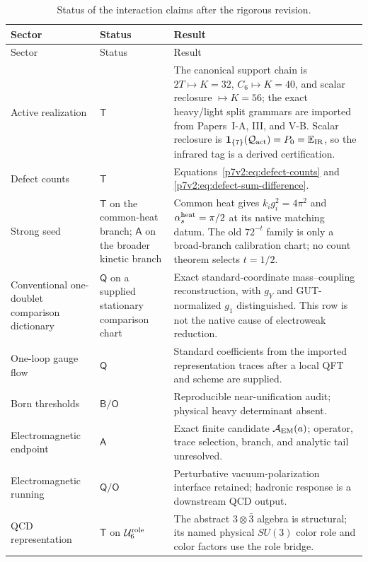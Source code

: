\documentclass[12pt,a4paper]{article}
\newcommand{\Aem}{\mathcal A_{\rm EM}}
\newcommand{\Urole}{\mathcal U_6^{\rm role}}
\begin{document}
\begin{longtable}{@{}L{0.22\textwidth}L{0.17\textwidth}L{0.53\textwidth}@{}}
\caption[Complete Paper--V-C result ledger]{Status of the interaction claims
after the rigorous revision.}\label{p7v2:tab:result-ledger}\\
\toprule
Sector & Status & Result\\
\midrule
\endfirsthead
\toprule
Sector & Status & Result\\
\midrule
\endhead
Active realization
& \(\mathsf T\)
& The canonical support chain is
\(2T\mapsto K=32\), \(C_6\mapsto K=40\), and scalar reclosure
\(\mapsto K=56\); the exact heavy/light split grammars are imported from
Papers~I-A, III, and V-B.  Scalar reclosure is
\(\mathbf1_{\{7\}}(\mathcal Q_{\rm act})=P_0=\mathbb E_{\rm IR}\), so the
infrared tag is a derived certification.\\
Defect counts
& \(\mathsf T\)
& Equations~\eqref{p7v2:eq:defect-counts} and
\eqref{p7v2:eq:defect-sum-difference}.\\
Strong seed
& \(\mathsf T\) on the common-heat branch; \(\mathsf A\) on the broader kinetic branch
& Common heat gives \(k_i g_i^2=4\pi^2\) and
\(\alpha_s^{\rm heat}=\pi/2\) at its native matching datum.  The old
\(72^{-t}\) family is only a broad-branch calibration chart; no count theorem
selects \(t=1/2\).\\
Conventional one-doublet comparison dictionary
& \(\mathsf Q\) on a supplied stationary comparison chart
& Exact standard-coordinate mass--coupling reconstruction, with \(g_Y\) and
GUT-normalized \(g_1\) distinguished.  This row is not the native cause of
electroweak reduction.\\
One-loop gauge flow
& \(\mathsf Q\)
& Standard coefficients from the imported representation traces after a local
QFT and scheme are supplied.\\
Born thresholds
& \(\mathsf B/\mathsf O\)
& Reproducible near-unification audit; physical heavy determinant absent.\\
Electromagnetic endpoint
& \(\mathsf A\)
& Exact finite candidate \(\Aem(a)\); operator, trace selection, branch, and
analytic tail unresolved.\\
Electromagnetic running
& \(\mathsf Q/\mathsf O\)
& Perturbative vacuum-polarization interface retained; hadronic response is a
downstream QCD output.\\
QCD representation
& \(\mathsf T\) on \(\Urole\)
& The abstract \(3\otimes\bar3\) algebra is structural; its named physical
\(SU(3)\) color role and color factors use the role bridge.\\

\end{longtable}
\end{document}
